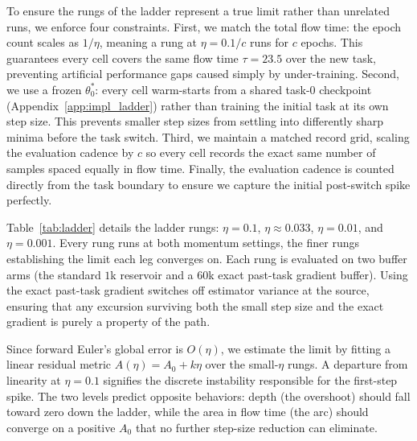 To ensure the rungs of the ladder represent a true limit rather than unrelated runs, we enforce four constraints. First, we match the total flow time: the epoch count scales as $1/\eta$, meaning a rung at $\eta = 0.1/c$ runs for $c$ epochs. This guarantees every cell covers the same flow time $\tau = 23.5$ over the new task, preventing artificial performance gaps caused simply by under-training. Second, we use a frozen $\theta_0^*$: every cell warm-starts from a shared task-$0$ checkpoint (Appendix~\ref{app:impl_ladder}) rather than training the initial task at its own step size. This prevents smaller step sizes from settling into differently sharp minima before the task switch. Third, we maintain a matched record grid, scaling the evaluation cadence by $c$ so every cell records the exact same number of samples spaced equally in flow time. Finally, the evaluation cadence is counted directly from the task boundary to ensure we capture the initial post-switch spike perfectly.

Table~\ref{tab:ladder} details the ladder rungs: $\eta = 0.1$, $\eta \approx 0.033$, $\eta = 0.01$, and $\eta = 0.001$. Every rung runs at both momentum settings, the finer rungs establishing the limit each leg converges on. Each rung is evaluated on two buffer arms (the standard $1$k reservoir and a $60$k exact past-task gradient buffer). Using the exact past-task gradient switches off estimator variance at the source, ensuring that any excursion surviving both the small step size and the exact gradient is purely a property of the path.

Since forward Euler's global error is $O(\eta)$, we estimate the limit by fitting a linear residual metric $A(\eta) = A_0 + k\eta$ over the small-$\eta$ rungs. A departure from linearity at $\eta = 0.1$ signifies the discrete instability responsible for the first-step spike. The two levels predict opposite behaviors: depth (the overshoot) should fall toward zero down the ladder, while the area in flow time (the arc) should converge on a positive $A_0$ that no further step-size reduction can eliminate.

